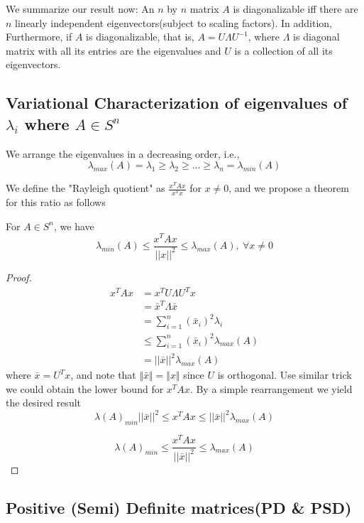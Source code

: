 We summarize our result now: An $n$ by $n$ matrix $A$ is diagonalizable iff there are $n$ linearly independent eigenvectors(subject to scaling factors). In addition, Furthermore, if $A$ is diagonalizable, that is, $A = U\Lambda U^{-1}$, where $\Lambda$ is diagonal matrix with all its entries are the eigenvalues and $U$ is a collection of all its eigenvectors. 

\subsection{Variational Characterization of eigenvalues of $\lambda_i$ where $A\in S^n$} 

We arrange the eigenvalues in a decreasing order, i.e., 
$$\lambda_{max}(A) = \lambda_1 \geq \lambda_2 \geq ... \geq \lambda_n =\lambda_{min}(A)$$


We define the "Rayleigh quotient" as $\frac{x^TAx}{x^Tx}$ for $x\neq 0$, and we propose a theorem for this ratio as follows

\begin{theorem}
For $A\in S^n$, we have 
$$\lambda_{min}(A) \leq \frac{x^TAx}{||x||^2}\leq \lambda_{max}(A),\ \forall x \neq 0$$
\end{theorem}


\begin{proof}
	\begin{align*}
	x^TAx &= x^TU\Lambda U^Tx\\
	&= \bar{x}^T\Lambda\bar{x}\\
	&= \sum^n_{i=1}(\bar{x}_i)^2\lambda_i\\
	&\leq \sum^n_{i=1}(\bar{x}_i)^2\lambda_{max}(A)\\
	&= ||\bar{x}||^2\lambda_{max}(A)
	\end{align*}
where $\bar{x}=U^Tx$, and note that $\Vert \bar{x}\Vert = \Vert {x}\Vert$ since $U$ is orthogonal. Use similar trick we could obtain the lower bound for $x^TAx$. By a simple rearrangement we yield the desired result
	\begin{equation*}
	\lambda(A)_{min}||\bar{x}||^2 \leq x^TAx \leq ||\bar{x}||^2\lambda_{max}(A)
	\end{equation*}
	
	\begin{equation*}
	\lambda(A)_{min} \leq \frac{x^TAx}{||\bar{x}||^2} \leq \lambda_{max}(A)
	\end{equation*}
\end{proof}


\subsection{Positive (Semi) Definite matrices(PD \& PSD)  }


